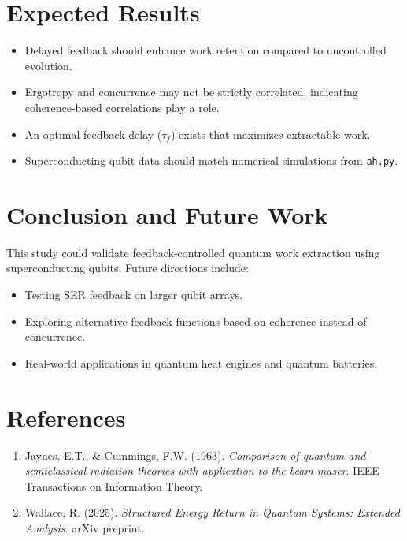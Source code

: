 \documentclass[a4paper,12pt]{article}
\begin{document}
\section{Expected Results}
\begin{itemize}
    \item Delayed feedback should enhance work retention compared to uncontrolled evolution.
    \item Ergotropy and concurrence may not be strictly correlated, indicating coherence-based correlations play a role.
    \item An optimal feedback delay (\(\tau_f\)) exists that maximizes extractable work.
    \item Superconducting qubit data should match numerical simulations from \texttt{ah.py}.
\end{itemize}


\section{Conclusion and Future Work}
This study could validate feedback-controlled quantum work extraction using superconducting qubits. Future directions include:
\begin{itemize}
    \item Testing SER feedback on larger qubit arrays.
    \item Exploring alternative feedback functions based on coherence instead of concurrence.
    \item Real-world applications in quantum heat engines and quantum batteries.
\end{itemize}

\section{References}
\begin{enumerate}
    \item Jaynes, E.T., \& Cummings, F.W. (1963). \textit{Comparison of quantum and semiclassical radiation theories with application to the beam maser}. IEEE Transactions on Information Theory.
    \item Wallace, R. (2025). \textit{Structured Energy Return in Quantum Systems: Extended Analysis}. arXiv preprint.
\end{enumerate}
\end{document}
